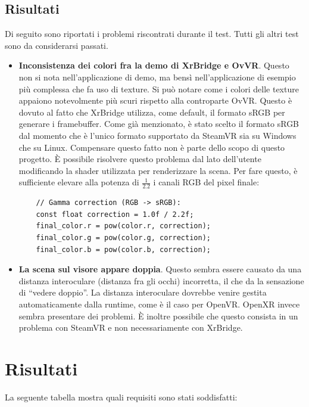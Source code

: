 \documentclass[twoside]{supsistudent}
\begin{document}
\section{Risultati}

Di seguito sono riportati i problemi riscontrati durante il test. Tutti gli altri test sono da considerarsi passati.

\begin{itemize}
  \item \textbf{Inconsistenza dei colori fra la demo di XrBridge e OvVR}. Questo non si nota nell'applicazione di demo, ma bensì nell'applicazione di esempio più complessa che fa uso di texture. Si può notare come i colori delle texture appaiono notevolmente più scuri rispetto alla controparte OvVR. Questo è dovuto al fatto che XrBridge utilizza, come default, il formato sRGB per generare i framebuffer. Come già menzionato, è stato scelto il formato sRGB dal momento che è l'unico formato supportato da SteamVR sia su Windows che su Linux. Compensare questo fatto non è parte dello scopo di questo progetto. È possibile risolvere questo problema dal lato dell'utente modificando la shader utilizzata per renderizzare la scena. Per fare questo, è sufficiente elevare alla potenza di $ \frac{1}{2.2} $ i canali RGB del pixel finale:
  \begin{verbatim}
    // Gamma correction (RGB -> sRGB):
    const float correction = 1.0f / 2.2f;
    final_color.r = pow(color.r, correction);
    final_color.g = pow(color.g, correction);
    final_color.b = pow(color.b, correction);
  \end{verbatim}
  \item \textbf{La scena sul visore appare doppia}. Questo sembra essere causato da una distanza interoculare (distanza fra gli occhi) incorretta, il che da la sensazione di ``vedere doppio''. La distanza interoculare dovrebbe venire gestita automaticamente dalla runtime, come è il caso per OpenVR. OpenXR invece sembra presentare dei problemi. È inoltre possibile che questo consista in un problema con SteamVR e non necessariamente con XrBridge. %
\end{itemize}

\chapter{Risultati}

La seguente tabella mostra quali requisiti sono stati soddisfatti:
\end{document}
